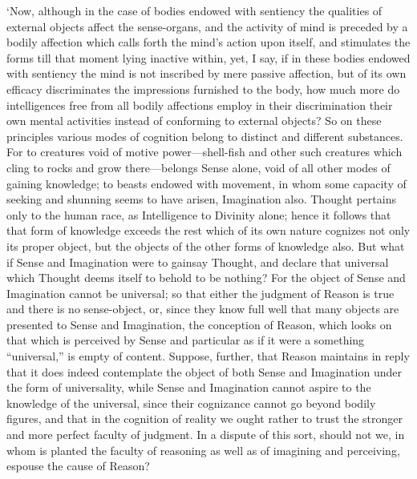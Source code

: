 \documentclass[11pt]{book}
\begin{document}
`Now, although in the case of bodies endowed with sentiency the
qualities of external objects affect the sense-organs, and the activity
of mind is preceded by a bodily affection which calls forth the mind's
action upon itself, and stimulates the forms till that moment lying
inactive within, yet, I say, if in these bodies endowed with sentiency
the mind is not inscribed by mere passive affection, but of its own
efficacy discriminates the impressions furnished to the body, how much
more do intelligences free from all bodily affections employ in their
discrimination their own mental activities instead of conforming to
external objects? So on these principles various modes of cognition
belong to distinct and different substances. For to creatures void of
motive power---shell-fish and other such creatures which cling to rocks
and grow there---belongs Sense alone, void of all other modes of gaining
knowledge; to beasts endowed with movement, in whom some capacity of
seeking and shunning seems to have arisen, Imagination also. Thought
pertains only to the human race, as Intelligence to Divinity alone;
hence it follows that that form of knowledge exceeds the rest which of
its own nature cognizes not only its proper object, but the objects of
the other forms of knowledge also. But what if Sense and Imagination
were to gainsay Thought, and declare that universal which Thought deems
itself to behold to be nothing? For the object of Sense and Imagination
cannot be universal; so that either the judgment of Reason is true and
there is no sense-object, or, since they know full well that many
objects are presented to Sense and Imagination, the conception of
Reason, which looks on that which is perceived by Sense and particular
as if it were a something ``universal,'' is empty of content. Suppose,
further, that Reason maintains in reply that it does indeed contemplate
the object of both Sense and Imagination under the form of
universality, while Sense and Imagination cannot aspire to the
knowledge of the universal, since their cognizance cannot go beyond
bodily figures, and that in the cognition of reality we ought rather to
trust the stronger and more perfect faculty of judgment. In a dispute of
this sort, should not we, in whom is planted the faculty of reasoning as
well as of imagining and perceiving, espouse the cause of Reason?
\end{document}
